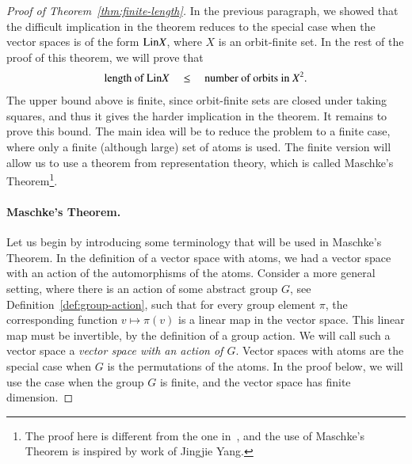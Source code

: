 \begin{proof}[Proof of Theorem~\ref{thm:finite-length}]
    
    In the previous paragraph, we showed that the difficult implication in the theorem reduces to the special case when the vector spaces is of the form  $\mathrm{Lin} X$, where $X$ is an orbit-finite set. In the rest of the proof of this theorem, we  will prove that
    \begin{align}
    \label{eq:length-bounded-by-square}
    \text{length of } {\mathrm{Lin}X}
    \quad \leq \quad 
    \text{number of orbits in $X^2$.}
    \end{align}
    The upper bound above is finite, since orbit-finite sets are closed under taking squares, and thus it gives the harder implication in the theorem.      It remains to prove this bound.
    The main idea will be to reduce the problem to a finite case, where only a finite (although large) set of atoms is used.  The finite version will allow us to use a theorem from representation theory, which is called Maschke's Theorem\footnote{The proof here is different from the one in~\cite{orbitFiniteVectorTheoretics}, and the use of Maschke's Theorem is inspired by work of Jingjie Yang.}.

    \paragraph*{Maschke's Theorem.} Let us begin by introducing some terminology that will be used in Maschke's Theorem. 
    In the definition of a vector space with atoms, we had a vector space with an action of the automorphisms of the atoms. Consider a more general setting, where there is an action of some abstract group $G$, see Definition~\ref{def:group-action}, such that for every group element $\pi$, the corresponding function $v \mapsto \pi(v)$ is a linear map in the vector space. This linear map must be invertible, by the definition of a group action. We will call such a vector space a \emph{vector space with an action of $G$}.
    Vector spaces with atoms are the special case  when $G$ is the permutations of the atoms. In the proof below, we will use the case when the group $G$ is finite, and the vector space has finite dimension. 
    

\end{proof}
